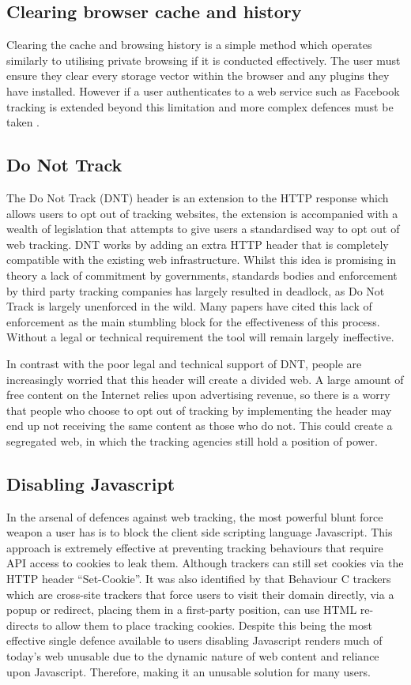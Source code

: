 \documentclass[12pt]{article}
\begin{document}
\subsection{Clearing browser cache and history}
Clearing the cache and browsing history is a simple method which operates similarly to utilising private browsing if it is conducted effectively. The user must ensure they clear every storage vector within the browser and any plugins they have installed. However if a user authenticates to a web service such as Facebook tracking is extended beyond this limitation and more complex defences must be taken \parencite{bujlow2015web}. 

\subsection{Do Not Track}
The Do Not Track (DNT) header is an extension to the HTTP response which allows users to opt out of tracking websites, the extension is accompanied with a wealth of legislation that attempts to give users a standardised way to opt out of web tracking. DNT works by adding an extra HTTP header that is completely compatible with the existing web infrastructure. Whilst this idea is promising in theory a lack of commitment by governments, standards bodies and enforcement by third party tracking companies has largely resulted in deadlock, as Do Not Track is largely unenforced in the wild. Many papers have cited this lack of enforcement as the main stumbling block for the effectiveness of this process. Without a legal or technical requirement the tool will remain largely ineffective. \newline

In contrast with the poor legal and technical support of DNT, people are increasingly worried that this header will create a divided web. A large amount of free content on the Internet relies upon advertising revenue, so there is a worry that people who choose to opt out of tracking by implementing the header may end up not receiving the same content as those who do not. This could create a segregated web, in which the tracking agencies still hold a position of power. 

\subsection{Disabling Javascript}
In the arsenal of defences against web tracking, the most powerful blunt force weapon a user has is to block the client side scripting language Javascript. This approach is extremely effective at preventing tracking behaviours that require API access to cookies to leak them. Although trackers can still set cookies via the HTTP header  ``Set-Cookie''. It was also identified by \parencite{roesner} that Behaviour C trackers which are cross-site trackers that force users to visit their domain directly, via a popup or redirect, placing them in a first-party position, can use HTML re-directs to allow them to place tracking cookies. Despite this being the most effective single defence available to users disabling Javascript renders much of today's web unusable due to the dynamic nature of web content and reliance upon Javascript. Therefore, making it an unusable solution for many users. 
\end{document}
